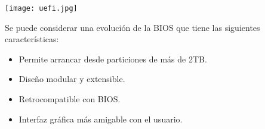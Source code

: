\begin{center}
    \texttt{[image: uefi.jpg]}
\end{center}

Se puede considerar una evolución de la BIOS  que tiene las siguientes características:

\begin{itemize}
    \item Permite arrancar desde particiones de más de 2TB.
    \item Diseño modular y extensible.
    \item Retrocompatible con BIOS.
    \item Interfaz gráfica más amigable con el usuario.
\end{itemize}






%
%
%
%
%
%
%
%
